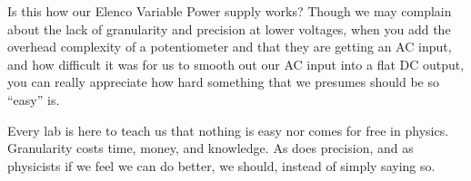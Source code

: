 \documentclass[%
 aip,
 jmp,
 amsmath,
 amssymb,
 reprint,%
 numerical,
 longbibliography,
]{revtex4-1}
\begin{document}
Is this how our Elenco Variable Power supply works? Though we may complain about the lack of granularity
and precision at lower voltages, when you add the overhead complexity of a potentiometer and that they
are getting an AC input, and how difficult it was for us to smooth out our AC input into a flat DC
output, you can really appreciate how hard something that we presumes should be so "`easy"' is. 

Every lab is here to teach us that nothing is easy nor comes for free in physics. Granularity costs
time, money, and knowledge. As does precision, and as physicists if we feel we can do better, we 
should, instead of simply saying so.
\end{document}
